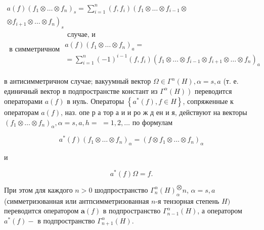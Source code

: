 \documentclass[10pt]{article}
\begin{document}
\[

\begin{gathered}

a(f)\left(f_{1} \otimes \ldots \otimes f_{n}\right)_{s}=\sum_{i=1}^{n}\left(f, f_{i}\right)\left(f_{1} \otimes \ldots \otimes f_{i-1} \otimes\right. \\

\left.\otimes f_{i+1} \otimes \ldots \otimes f_{n}\right)_{s} \\

\text { в симметричном } \begin{array}{c}

\text { случае, и } \\

a(f)\left(f_{1} \otimes \ldots \otimes f_{n}\right)_{a}= \\

=\sum_{i=1}^{n}(-1)^{i-1}\left(f, f_{i}\right)\left(f_{1} \otimes \ldots \otimes f_{i-1} \otimes f_{i+1} \otimes \ldots \otimes f_{n}\right)_{a}

\end{array}

\end{gathered}

\]



в антисимметричном случае; вакуумный вектор $\Omega \in \Gamma^{\alpha}(H), \alpha=s, a$ (т. е. единичный вектор в подпространстве констант из $\left.\Gamma^{\alpha}(H)\right)$ переводится операторами $a(f)$ в нуль. Операторы $\left\{a^{*}(f), f \in H\right\}$, сопряженные к операторам $a(f)$, наз. опе р а тор а и и ро ж д ен и я, действуют на векторы $\left(f_{1} \otimes \ldots \otimes f_{n}\right)_{\alpha}, \alpha=s, a, h=$ $=1,2, \ldots$ по формулам



\[

a^{*}(f)\left(f_{1} \otimes \ldots \otimes f_{n}\right)_{\alpha}=\left(f \otimes f_{1} \otimes \ldots \otimes f_{n}\right)_{\alpha}

\]



и



\[

a^{*}(f) \Omega=f .

\]



При этом для каждого $n>0$ шодпространство $\Gamma_{n}^{\alpha}(H)_{\alpha}^{\bigotimes} n$, $\alpha=s, a$ (симметризованная или антпсимметризованная $n$-я тензорная степень $H)$ переводится оператором $\boldsymbol{a}(f)$ в подпространство $\Gamma_{n-1}^{\alpha}(H)$, а оператором $a^{*}(f)-$ в подпространство $\Gamma_{n+1}^{\alpha}(H)$.
\end{document}
